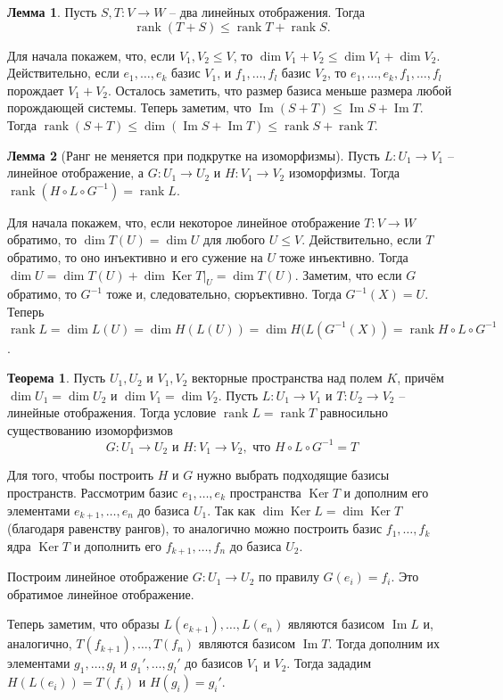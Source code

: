 \documentclass[10pt,a4paper,oneside]{book}
\theoremstyle{definition}
\newtheorem{thm}{Теорема}
\newtheorem{lem}{Лемма}
\newcommand{\rank}{\operatorname{rank}}
\DeclareMathOperator{\Ker}{Ker}
\newcommand{\im}{\operatorname{Im}}
\def\thrm{\begin{thm}}
\def\ethrm{\end{thm}}
\def\lm{\begin{lem}}
\def\elm{\end{lem}}
\begin{document}
\lm Пусть $S, T \colon V \to W$ -- два линейных отображения. Тогда $$\rank (T + S) \leq \rank T + \rank S.$$
\elm
\proof Для начала покажем, что, если $V_1,V_2 \leq V$, то $\dim V_1 +V_2 \leq \dim V_1 + \dim V_2$. Действительно, если $e_1,\dots, e_k$ базис  $V_1$, и $f_1,\dots, f_l$ базис $V_2$, то $e_1,\dots, e_k, f_1, \dots, f_l$ порождает $V_1+V_2$. Осталось заметить, что размер базиса меньше размера любой порождающей системы.
Теперь заметим, что $\im (S+T) \leq \im S + \im T$. Тогда $\rank (S+T) \leq \dim (\im S + \im T) \leq \rank S + \rank T$.
\endproof

\lm[Ранг не меняется при подкрутке на изоморфизмы] Пусть $L \colon U_1 \to V_1$ -- линейное отображение, а $G \colon U_1 \to U_2 $ и $H \colon V_1 \to V_2$ изоморфизмы. Тогда $\rank (H \circ L \circ G^{-1}) = \rank L$.
\elm
\proof Для начала покажем, что, если некоторое линейное отображение $T\colon V \to W$ обратимо, то  $\dim T(U)= \dim U$ для любого $U \leq V$. Действительно, если $T$ обратимо, то оно инъективно и его сужение на $U$ тоже инъективно. Тогда $\dim U = \dim T(U) + \dim \Ker T|_U= \dim T(U)$.
Заметим, что если $G$ обратимо, то  $G^{-1}$ тоже и, следовательно, сюръективно. Тогда $G^{-1}(X)=U$.  Теперь $\rank L= \dim L(U)= \dim H(L(U))= \dim H(L(G^{-1}(X))= \rank H \circ L \circ G^{-1}$.
\endproof

\thrm Пусть $U_1, U_2$ и $V_1,V_2$ векторные пространства над полем $K$, причём  $\dim U_1=\dim U_2$ и $\dim V_1 =\dim V_2$. Пусть $L \colon U_1\to V_1$ и $T \colon U_2 \to V_2$ -- линейные отображения. Тогда условие $\rank L=\rank T$ равносильно существованию изоморфизмов
$$G \colon U_1 \to U_2 \text{ и }  H \colon V_1 \to V_2, \text{ что }  H \circ L \circ G^{-1}=T$$
\ethrm
\proof Для того, чтобы построить $H$ и $G$ нужно выбрать подходящие базисы пространств. Рассмотрим базис $e_1,\dots, e_k$ пространства $\Ker T$ и дополним его элементами $e_{k+1},\dots, e_n$ до базиса $U_1$. Так как $\dim \Ker L = \dim \Ker T$ (благодаря равенству рангов), то аналогично можно построить базис $f_1,\dots, f_k$ ядра $\Ker T$ и дополнить его $f_{k+1},\dots, f_n$ до базиса $U_2$.

Построим линейное отображение $G\colon U_1 \to U_2$ по правилу $G(e_i)=f_i$. Это обратимое линейное отображение.

Теперь заметим, что образы $L(e_{k+1}), \dots, L(e_n)$ являются базисом $\im L$ и, аналогично, $T(f_{k+1}), \dots, T(f_n)$  являются базисом $\im T$. Тогда дополним их элементами $g_1,\dots,g_l$ и $ g_1',\dots, g_l'$ до базисов $V_1$ и $V_2$. Тогда  зададим $H(L(e_i))=T(f_i)$ и $H(g_i)=g_i'$.
\end{document}
